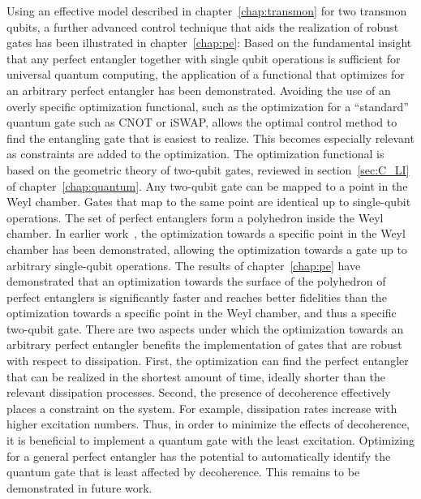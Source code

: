 Using an effective model described in chapter~\ref{chap:transmon} for two
transmon qubits, a further advanced control technique that aids the realization
of robust gates has been illustrated in chapter~\ref{chap:pe}:
Based on the fundamental insight that any perfect entangler together with single
qubit operations is sufficient for universal quantum computing, the application
of a functional that optimizes for an arbitrary perfect entangler has been
demonstrated.  Avoiding the use of an overly specific optimization functional,
such as the optimization for a ``standard'' quantum gate such as CNOT or iSWAP,
allows the optimal control method to find the entangling gate that is easiest to
realize.  This becomes especially relevant as constraints are added to the
optimization.  The optimization functional is based on the geometric theory of
two-qubit gates, reviewed in section~\ref{sec:C_LI} of
chapter~\ref{chap:quantum}. Any two-qubit gate can be mapped to a point in the
Weyl chamber. Gates that map to the same point are identical up to single-qubit
operations. The set of perfect entanglers form a polyhedron inside the Weyl
chamber.  In earlier work~\cite{ReichDipl10, MullerPRA11}, the optimization
towards a specific point in the Weyl chamber has been demonstrated, allowing the
optimization towards a gate up to arbitrary single-qubit operations. The results
of chapter~\ref{chap:pe} have demonstrated that an optimization towards the
surface of the polyhedron of perfect entanglers is significantly faster and
reaches better fidelities than the optimization towards a specific point in the
Weyl chamber, and thus a specific two-qubit gate.  There are two aspects under
which the optimization towards an arbitrary perfect entangler benefits the
implementation of gates that are robust with respect to dissipation. First, the
optimization can find the perfect entangler that can be realized in the shortest
amount of time, ideally shorter than the relevant dissipation processes. Second,
the presence of decoherence effectively places a constraint on the system. For
example, dissipation rates increase with higher excitation numbers. Thus, in
order to minimize the effects of decoherence, it is beneficial to implement
a quantum gate with the least excitation. Optimizing for a general perfect
entangler has the potential to automatically identify the quantum gate that is
least affected by decoherence.  This remains to be demonstrated in future work.


